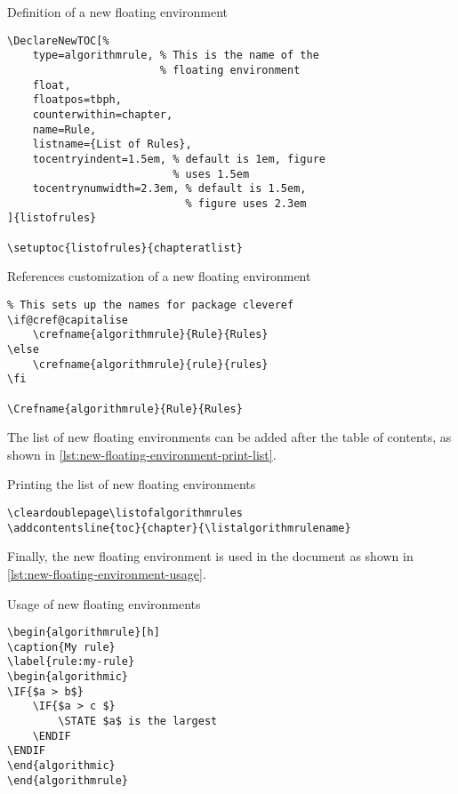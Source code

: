 \begin{listing}
\caption{Definition of a new floating environment}
\label{lst:new-floating-environment}
\centering
\begin{verbatim}
\DeclareNewTOC[%
    type=algorithmrule, % This is the name of the
                        % floating environment
    float,
    floatpos=tbph,
    counterwithin=chapter,
    name=Rule,
    listname={List of Rules},
    tocentryindent=1.5em, % default is 1em, figure
                          % uses 1.5em
    tocentrynumwidth=2.3em, % default is 1.5em,
                            % figure uses 2.3em
]{listofrules}

\setuptoc{listofrules}{chapteratlist}
\end{verbatim}
\end{listing}


\begin{listing}
\caption[References customization of new floating environment]
{References customization of a new floating environment}
\label{lst:new-floating-environment-references}
\centering
\begin{verbatim}
% This sets up the names for package cleveref
\if@cref@capitalise
    \crefname{algorithmrule}{Rule}{Rules}
\else
    \crefname{algorithmrule}{rule}{rules}
\fi

\Crefname{algorithmrule}{Rule}{Rules}
\end{verbatim}
\end{listing}

The list of new floating environments can be added after the table of contents, as shown in \cref{lst:new-floating-environment-print-list}.

\begin{listing}
\caption{Printing the list of new floating environments}
\label{lst:new-floating-environment-print-list}
\centering
\begin{verbatim}
\cleardoublepage\listofalgorithmrules
\addcontentsline{toc}{chapter}{\listalgorithmrulename}
\end{verbatim}
\end{listing}

Finally, the new floating environment is used in the document as shown in \cref{lst:new-floating-environment-usage}.

\begin{listing}
\caption{Usage of new floating environments}
\label{lst:new-floating-environment-usage}
\begin{verbatim}
\begin{algorithmrule}[h]
\caption{My rule}
\label{rule:my-rule}
\begin{algorithmic}
\IF{$a > b$}
    \IF{$a > c $}
        \STATE $a$ is the largest
    \ENDIF
\ENDIF
\end{algorithmic}
\end{algorithmrule}
\end{verbatim}
\end{listing}


